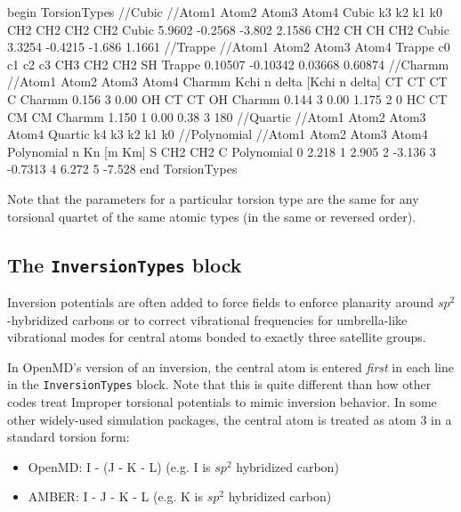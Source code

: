 \documentclass[letterpaper]{report}
\begin{document}
\begin{code}[caption={[An example of a TorsionTypes block.] A
simple example of a TorsionTypes block.  Energy constants are given in
kcal / mol, and when required by the form, $\delta$ angles are given
in degrees.},
label={sch:TorsionTypes}]
begin TorsionTypes
//Cubic
//Atom1 Atom2   Atom3   Atom4   Cubic   k3       k2        k1      k0  
CH2     CH2     CH2     CH2     Cubic   5.9602   -0.2568   -3.802  2.1586
CH2     CH      CH      CH2     Cubic   3.3254   -0.4215   -1.686  1.1661
//Trappe
//Atom1 Atom2   Atom3   Atom4   Trappe  c0       c1        c2      c3
CH3     CH2     CH2     SH      Trappe  0.10507  -0.10342  0.03668 0.60874     
//Charmm
//Atom1 Atom2   Atom3   Atom4   Charmm  Kchi     n    delta  [Kchi n delta]
CT      CT      CT      C       Charmm  0.156    3    0.00
OH      CT      CT      OH      Charmm  0.144    3    0.00    1.175 2  0
HC      CT      CM      CM      Charmm  1.150    1    0.00    0.38  3 180
//Quartic
//Atom1 Atom2   Atom3   Atom4   Quartic          k4    k3    k2    k1    k0
//Polynomial
//Atom1 Atom2   Atom3   Atom4   Polynomial  n Kn [m  Km] 
S       CH2     CH2     C   Polynomial 0 2.218 1 2.905 2 -3.136 3 -0.7313 4 6.272 5 -7.528
end TorsionTypes
\end{code}

Note that the parameters for a particular torsion type are the same
for any torsional quartet of the same atomic types (in the same or
reversed order).

\subsection{\label{section:ffInversion}The {\tt InversionTypes} block}

Inversion potentials are often added to force fields to enforce
planarity around $sp^2$-hybridized carbons or to correct vibrational
frequencies for umbrella-like vibrational modes for central atoms
bonded to exactly three satellite groups.

In OpenMD's version of an inversion, the central atom is entered {\it
  first} in each line in the {\tt InversionTypes} block. Note that
this is quite different than how other codes treat Improper torsional
potentials to mimic inversion behavior.  In some other widely-used
simulation packages, the central atom is treated as atom 3 in a
standard torsion form:
\begin{itemize}
  \item OpenMD:  I - (J - K - L)  (e.g. I is $sp^2$ hybridized carbon)
  \item AMBER:   I - J - K - L   (e.g. K is $sp^2$ hybridized carbon)
\end{itemize}
\end{document}
